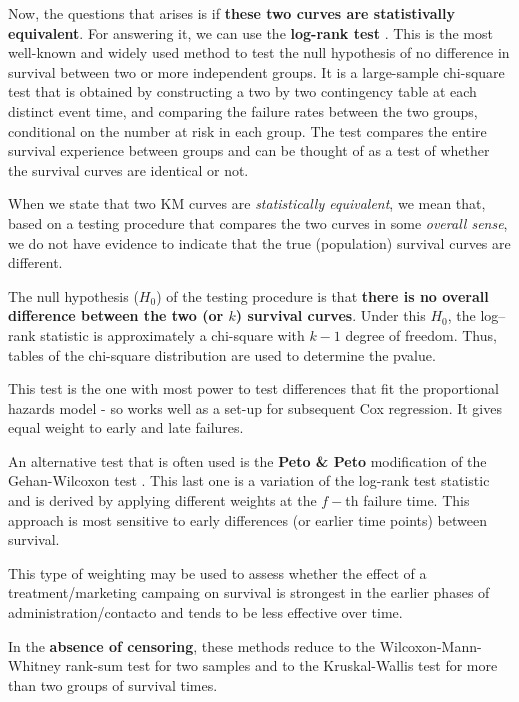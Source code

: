\documentclass[]{book}
\theoremstyle{definition}
\theoremstyle{definition}
\theoremstyle{definition}
\theoremstyle{remark}
\let\BeginKnitrBlock\begin \let\EndKnitrBlock\end
\begin{document}
Now, the questions that arises is if \textbf{these two curves are
statistivally equivalent}. For answering it, we can use the
\textbf{log-rank test} \citep{mantel, CIS-11103}. This is the most
well-known and widely used method to test the null hypothesis of no
difference in survival between two or more independent groups. It is a
large-sample chi-square test that is obtained by constructing a two by
two contingency table at each distinct event time, and comparing the
failure rates between the two groups, conditional on the number at risk
in each group. The test compares the entire survival experience between
groups and can be thought of as a test of whether the survival curves
are identical or not.

\BeginKnitrBlock{rmdhint_sestelo}
When we state that two KM curves are \emph{statistically equivalent}, we
mean that, based on a testing procedure that compares the two curves in
some \emph{overall sense}, we do not have evidence to indicate that the
true (population) survival curves are different.
\EndKnitrBlock{rmdhint_sestelo}

The null hypothesis (\(H_0\)) of the testing procedure is that
\textbf{there is no overall difference between the two (or \(k\))
survival curves}. Under this \(H_0\), the log--rank statistic is
approximately a chi-square with \(k-1\) degree of freedom. Thus, tables
of the chi-square distribution are used to determine the pvalue.

This test is the one with most power to test differences that fit the
proportional hazards model - so works well as a set-up for subsequent
Cox regression. It gives equal weight to early and late failures.

An alternative test that is often used is the \textbf{Peto \& Peto}
\citep{CIS-11103} modification of the Gehan-Wilcoxon test
\citep{10.2307/2333825}. This last one is a variation of the log-rank
test statistic and is derived by applying different weights at the
\(f-\)th failure time. This approach is most sensitive to early
differences (or earlier time points) between survival.

This type of weighting may be used to assess whether the effect of a
treatment/marketing campaing on survival is strongest in the earlier
phases of administration/contacto and tends to be less effective over
time.

In the \textbf{absence of censoring}, these methods reduce to the
Wilcoxon-Mann-Whitney rank-sum test \citep{mann1947} for two samples and
to the Kruskal-Wallis test \citep{doi:10.1080/01621459.1952.10483441}
for more than two groups of survival times.
\end{document}
